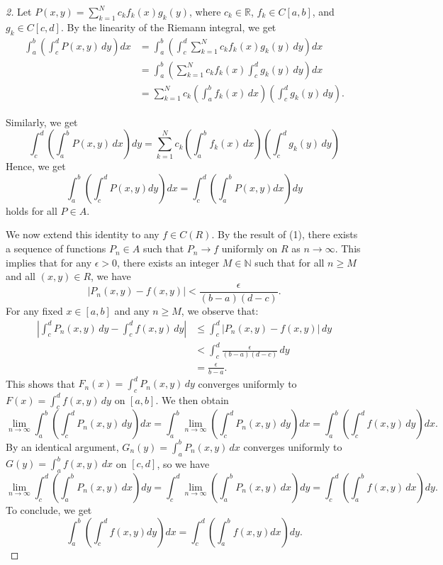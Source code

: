 \begin{proof}[2]

    Let $P(x,y) = \sum_{k=1}^N c_k f_k(x) g_k(y)$, where $c_k \in \mathbb{R}$, $f_k \in C[a,b]$, and $g_k \in C[c,d]$. By the linearity of the Riemann integral, we get
    \[
    \begin{aligned}
    \int_a^b \left( \int_c^d P(x,y) \, dy \right) dx
    &= \int_a^b \left( \int_c^d \sum_{k=1}^N c_k f_k(x) g_k(y) \, dy \right) dx \\
    &= \int_a^b \left( \sum_{k=1}^N c_k f_k(x) \int_c^d g_k(y) \, dy \right) dx \\
    &= \sum_{k=1}^N c_k
       \left( \int_a^b f_k(x) \, dx \right)
       \left( \int_c^d g_k(y) \, dy \right).
    \end{aligned}
    \]

    Similarly, we get
    \[
    \int_c^d \left( \int_a^b P(x,y) \, dx \right) dy = \sum_{k=1}^N c_k \left( \int_a^b f_k(x) \, dx \right) \left( \int_c^d g_k(y) \, dy \right)
    \]
    Hence, we get
    \[
    \int_a^b (\int_c^d P(x,y) dy) dx = \int_c^d (\int_a^b P(x,y) dx) dy
    \]
    holds for all $P \in A$.

    We now extend this identity to any $f \in C(R)$. By the result of (1), there exists a sequence of functions $P_n \in A$ such that $P_n \to f$ uniformly on $R$ as $n \to \infty$. This implies that for any $\epsilon > 0$, there exists an integer $M \in \mathbb{N}$ such that for all $n \ge M$ and all $(x,y) \in R$, we have 
    \[
    |P_n(x,y) - f(x,y)| < \frac{\epsilon}{(b-a)(d-c)}.
    \]
    For any fixed $x \in [a,b]$ and any $n \ge M$, we observe that:
    \[
    \begin{aligned}
    \left| \int_c^d P_n(x,y) \, dy - \int_c^d f(x,y) \, dy \right|
    &\le \int_c^d |P_n(x,y) - f(x,y)| \, dy \\
    &< \int_c^d \frac{\epsilon}{(b-a)(d-c)} \, dy \\
    &= \frac{\epsilon}{b-a}.
    \end{aligned}
    \]
    This shows that $F_n(x) = \int_c^d P_n(x,y) \, dy$ converges uniformly to $F(x) = \int_c^d f(x,y) \, dy$ on $[a,b]$. We then obtain
    \[
    \lim_{n\to\infty} \int_a^b \left( \int_c^d P_n(x,y) \, dy \right) dx = \int_a^b \lim_{n\to\infty} \left( \int_c^d P_n(x,y) \, dy \right) dx = \int_a^b \left( \int_c^d f(x,y) \, dy \right) dx.
    \]
    By an identical argument, $G_n(y) = \int_a^b P_n(x,y) \, dx$ converges uniformly to $G(y) = \int_a^b f(x,y) \, dx$ on $[c,d]$, so we have
    \[
    \lim_{n\to\infty} \int_c^d \left( \int_a^b P_n(x,y) \, dx \right) dy = \int_c^d \lim_{n\to\infty} \left( \int_a^b P_n(x,y) \, dx \right) dy = \int_c^d \left( \int_a^b f(x,y) \, dx \right) dy.
    \]
    To conclude, we get
    \[
    \int_a^b (\int_c^d f(x,y) dy) dx = \int_c^d (\int_a^b f(x,y) dx) dy.
    \]
    
\end{proof}


